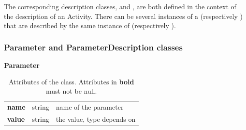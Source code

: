 The corresponding description classes,  and  , are both defined in the context of the description of an Activity.
There can be several instances of a  (respectively ) that are described by the same instance of   (respectively ).


\subsubsection{Parameter and ParameterDescription classes}
\label{sec:parameterandD}


\begin{table}[ht]
\small
{}\textwidth
 \textbf{\normalsize Parameter}\vspace{0.25em}\\
 \begin{tabulary}{1.0\textwidth}{llL}
 \toprule
  &    & \\
 \midrule
\textbf{name} &  string & name of the parameter \\
\textbf{value} & string  & the value, type depends on  \\
\bottomrule
\end{tabulary}
\caption[Attributes of the  class]{Attributes of the  class. Attributes in \textbf{bold} must not be null.}
\label{tab:param}
\end{table}

